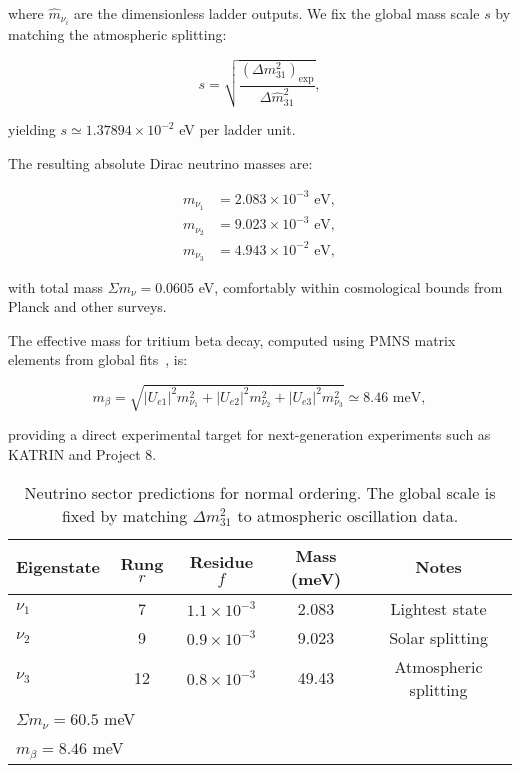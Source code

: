 \documentclass[%
amsmath,amssymb,
aps,
prb,
floatfix,
twocolumn
]{revtex4-2}
\begin{document}
where $\hat{m}_{\nu_i}$ are the dimensionless ladder outputs. We fix the global mass scale $s$ by matching the atmospheric splitting:

\begin{equation}
s = \sqrt{\frac{(\Delta m_{31}^2)_{\text{exp}}}{\Delta \hat{m}_{31}^2}},
\label{eq:global_scale}
\end{equation}

yielding $s \simeq 1.37894 \times 10^{-2}$ eV per ladder unit.

The resulting absolute Dirac neutrino masses are:

\begin{align}
m_{\nu_1} &= 2.083 \times 10^{-3} \text{ eV}, \\
m_{\nu_2} &= 9.023 \times 10^{-3} \text{ eV}, \\
m_{\nu_3} &= 4.943 \times 10^{-2} \text{ eV},
\end{align}

with total mass $\Sigma m_\nu = 0.0605$ eV, comfortably within cosmological bounds from Planck and other surveys.

The effective mass for tritium beta decay, computed using PMNS matrix elements from global fits~\cite{NuFIT52}, is:

\begin{equation}
m_\beta = \sqrt{|U_{e1}|^2 m_{\nu_1}^2 + |U_{e2}|^2 m_{\nu_2}^2 + |U_{e3}|^2 m_{\nu_3}^2} \simeq 8.46 \text{ meV},
\label{eq:beta_decay_mass}
\end{equation}

providing a direct experimental target for next-generation experiments such as KATRIN and Project 8.

\begin{table}[h]
\centering
\caption{Neutrino sector predictions for normal ordering. The global scale is fixed by matching $\Delta m_{31}^2$ to atmospheric oscillation data.}
\label{tab:neutrinos}
\begin{tabular}{lcccc}
\hline\hline
Eigenstate & Rung $r$ & Residue $f$ & Mass (meV) & Notes \\
\hline
$\nu_1$ & 7 & $1.1 \times 10^{-3}$ & 2.083 & Lightest state \\
$\nu_2$ & 9 & $0.9 \times 10^{-3}$ & 9.023 & Solar splitting \\
$\nu_3$ & 12 & $0.8 \times 10^{-3}$ & 49.43 & Atmospheric splitting \\
\hline
\multicolumn{4}{l}{$\Sigma m_\nu = 60.5$ meV} \\
\multicolumn{4}{l}{$m_\beta = 8.46$ meV} \\
\hline\hline
\end{tabular}
\end{table}
\end{document}
